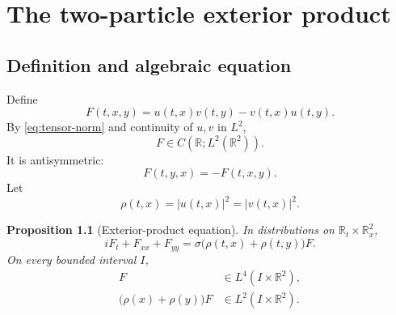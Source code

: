 \documentclass[11pt,oneside]{book}
\newtheorem{proposition}[theorem]{Proposition}
\theoremstyle{definition}
\theoremstyle{remark}
\newcommand{\R}{\mathbb R}
\newcommand{\1}{\mathbf 1}
\begin{document}
\chapter{The two-particle exterior product}\label{chap:exterior}

\section{Definition and algebraic equation}
Define
\begin{equation}
 F(t,x,y)=u(t,x)v(t,y)-v(t,x)u(t,y).                \label{eq:F-def}
\end{equation}
By \eqref{eq:tensor-norm} and continuity of $u,v$ in $L^2$,
\begin{equation}
 F\in C(\R;L^2(\R^2)).                             \label{eq:F-C-L2}
\end{equation}
It is antisymmetric:
\begin{equation}
 F(t,y,x)=-F(t,x,y).                                \label{eq:F-antisym}
\end{equation}
Let
\[
  \rho(t,x)=|u(t,x)|^2=|v(t,x)|^2.
\]

\begin{proposition}[Exterior-product equation]\label{prop:F-equation}
In distributions on $\R_t\times\R_x^2$,
\begin{equation}
 iF_t+F_{xx}+F_{yy}
 =\sigma\bigl(\rho(t,x)+\rho(t,y)\bigr)F.          \label{eq:F-equation}
\end{equation}
On every bounded interval $I$,
\begin{align}
 F&\in L^4(I\times\R^2),                           \label{eq:F-L4}\\
 \bigl(\rho(x)+\rho(y)\bigr)F&\in L^2(I\times\R^2). \label{eq:QF-L2}
\end{align}
\end{proposition}
\end{document}
